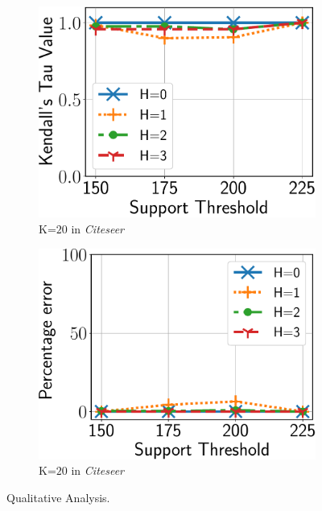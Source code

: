 \begin{figure}
\begin{subfigure}[b]{0.25\textwidth}
		\includegraphics[keepaspectratio,scale=0.24, angle=0]{img2/citeseer/citeseer_kt.pdf}
		\caption{\scriptsize {\sf K}=$20$ in {\em Citeseer}}
	\end{subfigure}%
	\begin{subfigure}[b]{0.25\textwidth}
		\includegraphics[keepaspectratio,scale=0.24, angle=0]{img2/citeseer/citeseer_spread.pdf}
		\caption{\scriptsize {\sf K}=$20$ in {\em Citeseer}}
		\label{fig:citeseer_error}
	\end{subfigure}
	\vspace{-2mm}
	\caption{\scriptsize Qualitative Analysis.}
	\label{fig:quality}
	\vspace{-2mm}
\end{figure}


